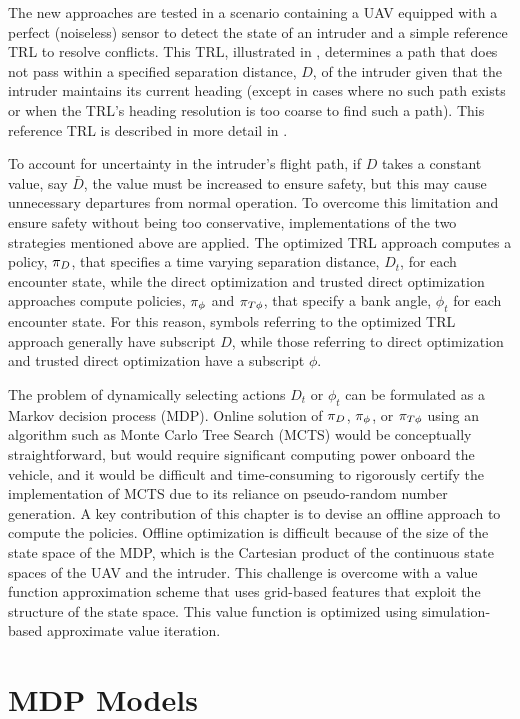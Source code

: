 The new approaches are tested in a scenario containing a UAV equipped with a perfect (noiseless) sensor to detect the state of an intruder and a simple reference TRL to resolve conflicts. This TRL, illustrated in , determines a path that does not pass within a specified separation distance, $D$, of the intruder given that the intruder maintains its current heading (except in cases where no such path exists or when the TRL's heading resolution is too coarse to find such a path).
This reference TRL is described in more detail in .

To account for uncertainty in the intruder's flight path, if $D$ takes a constant value, say $\bar{D}$, the value must be increased to ensure safety, but this may cause unnecessary departures from normal operation.
To overcome this limitation and ensure safety without being too conservative, implementations of the two strategies mentioned above are applied.
The optimized TRL approach computes a policy, ${\pi}_{D}$, that specifies a time varying separation distance, $D_t$, for each encounter state, while the direct optimization and trusted direct optimization approaches compute policies, ${\pi}_\phi$ and ${\pi}_{T\phi}$, that specify a bank angle, $\phi_t$ for each encounter state.
For this reason, symbols referring to the optimized TRL approach generally have subscript $D$, while those referring to direct optimization and trusted direct optimization have a subscript $\phi$.

The problem of dynamically selecting actions $D_t$ or $\phi_t$ can be formulated as a Markov decision process (MDP). Online solution of ${\pi}_{D}$, ${\pi}_\phi$, or ${\pi}_{T\phi}$ using an algorithm such as Monte Carlo Tree Search (MCTS) \cite{couetoux2011double} would be conceptually straightforward, but would require significant computing power onboard the vehicle, and it would be difficult and time-consuming to rigorously certify the implementation of MCTS due to its reliance on pseudo-random number generation. A key contribution of this chapter is to devise an offline approach to compute the policies. Offline optimization is difficult because of the size of the state space of the MDP, which is the Cartesian product of the continuous state spaces of the UAV and the intruder. This challenge is overcome with a value function approximation scheme that uses grid-based features that exploit the structure of the state space. This value function is optimized using simulation-based approximate value iteration.


\section{MDP Models}\label{sec:uavmodel}

